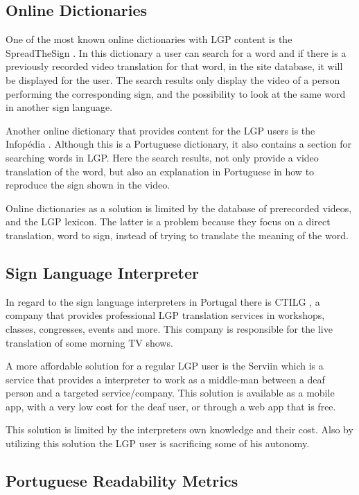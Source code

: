 \documentclass[runningheads]{llncs}
\begin{document}
\subsection{Online Dictionaries}

One of the most known online dictionaries with LGP content is the SpreadTheSign \cite{sts_2020}.
In this dictionary a user can search for a word and if there is a previously recorded video translation for that word, in the site database, it will be displayed for the user.
The search results only display the video of a person performing the corresponding sign, and the possibility to look at the same word in another sign language.

Another online dictionary that provides content for the LGP users is the Infopédia \cite{infopedia_2020}.
Although this is a Portuguese dictionary, it also contains a section for searching words in LGP.
Here the search results, not only provide a video translation of the word, but also an explanation in Portuguese in how to reproduce the sign shown in the video.

Online dictionaries as a solution is limited by the database of prerecorded videos, and the LGP lexicon.
The latter is a problem because they focus on a direct translation, word to sign, instead of trying to translate the meaning of the word.

\subsection{Sign Language Interpreter}

In regard to the sign language interpreters in Portugal there is CTILG \cite{ctilg_2020}, a company that provides professional LGP translation services in workshops, classes, congresses, events and more.
This company is responsible for the live translation of some morning TV shows.

A more affordable solution for a regular LGP user is the Serviin \cite{serviin_2020} which is a service that provides a interpreter to work as a middle-man between a deaf person and a targeted service/company.
This solution is available as a mobile app, with a very low cost for the deaf user, or through a  web app that is free.

This solution is limited by the interpreters own knowledge and their cost.
Also by utilizing this solution the LGP user is sacrificing some of his autonomy.

\subsection{Portuguese Readability Metrics}
\end{document}
